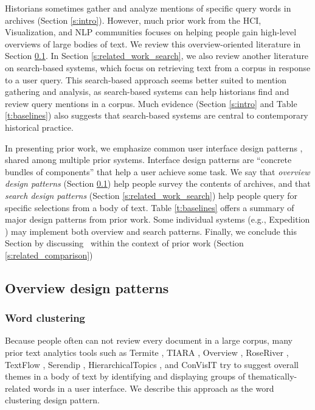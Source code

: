 Historians sometimes gather and analyze mentions of specific query words in archives (Section \ref{s:intro}).
However, much prior work from the HCI, Visualization, and NLP communities focuses on helping people gain high-level overviews of large bodies of text.
We review this overview-oriented literature in Section \ref{s:related_work_overview}.
In Section \ref{s:related_work_search}, we also review another literature on search-based systems, which focus on retrieving text from a corpus in response to a user query.
This search-based approach seems better suited to mention gathering and analysis, as search-based systems can help historians find and review query mentions in a corpus.
Much evidence (Section \ref{s:intro} and Table \ref{t:baselines}) also suggests that search-based systems are central to contemporary historical practice.

In presenting prior work, we emphasize common user interface design patterns \cite{Tidwell}, shared among multiple prior systems.
Interface design patterns are ``concrete bundles of components'' \cite{DesigningInterfaces} that help a user achieve some task. 
We say that \textit{overview design patterns} (Section \ref{s:related_work_overview}) help people survey the contents of archives, and that \textit{search design patterns} (Section \ref{s:related_work_search}) help people query for specific selections from a body of text.
Table \ref{t:baselines} offers a summary of major design patterns from prior work.
Some individual systems (e.g., Expedition \cite{expedition}) may implement both overview and search patterns. Finally, we conclude this Section by discussing \ours~within the context of prior work (Section \ref{s:related_comparison})

\subsection{Overview design patterns}\label{s:related_work_overview}

\subsubsection{\textbf{Word clustering}}\label{s:word_clustering_family}

Because people often can not review every document in a large corpus, many prior text analytics tools such as Termite \cite{termite}, TIARA \cite{tiara}, Overview \cite{overview}, RoseRiver \cite{HierarchicalTopics}, TextFlow \cite{textflow}, Serendip \cite{serendip}, HierarchicalTopics \cite{HierarchicalTopics_Dou}, and ConVisIT \cite{tiisclusterthree} try to suggest overall themes in a body of text by identifying and displaying groups of thematically-related words in a user interface.
We describe this approach as the word clustering design pattern.

